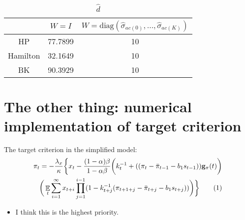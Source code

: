 \documentclass[11pt]{article}
\renewcommand{\[}{\begin{equation}}
\renewcommand{\]}{\end{equation}}
\DeclareMathOperator{\E}{\mathbb{E}}
\newcommand\numberthis{\addtocounter{equation}{1}\tag{\theequation}} %
\begin{document}
\begin{center}
\begin{table}[h!]
\caption{$\hat{d}$}
\begin{tabular}{ c |c |c }
  & $W = I$ & $W = \text{diag}(\hat{\sigma}_{ac(0)}, \dots, \hat{\sigma}_{ac(K)})$ \\ 
  \hline
 HP & 77.7899 & 10 \\  
 \hline
 Hamilton & 32.1649 & 10 \\  
 \hline
 BK & 90.3929 & 10    
\end{tabular}
\end{table}
\end{center}

\section{The other thing: numerical implementation of target criterion}
The target criterion in the simplified model:
\begin{align*}
\pi_t  = -\frac{\lambda_x}{\kappa}\bigg\{x_t - \frac{(1-\alpha)\beta}{1-\alpha\beta} \bigg(k_t^{-1}+((\pi_t - \bar{\pi}_{t-1}-b_1 s_{t-1}))\mathbf{g}_{\pi}(t) \bigg) \\
\bigg(\E_t\sum_{i=1}^{\infty}x_{t+i}\prod_{j=1}^{i-1}(1-k_{t+j}^{-1}(\pi_{t+1+j} - \bar{\pi}_{t+j}-b_1 s_{t+j})) \bigg)
\bigg\} \numberthis \label{target}
\end{align*}

\begin{itemize}
\item I think this is the highest priority.
\end{itemize}
\end{document}
